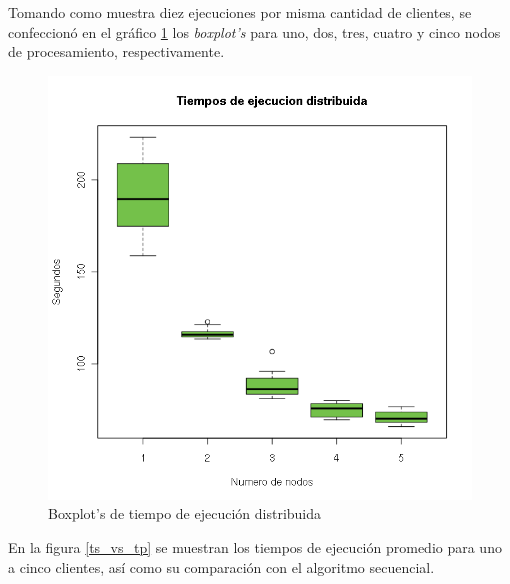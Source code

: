 Tomando como muestra diez ejecuciones por misma cantidad de clientes, se confeccionó en el gráfico \ref{execution_boxplot} los
\textit{boxplot's} para uno, dos, tres, cuatro y cinco nodos de procesamiento, respectivamente.
\begin{figure}[!ht]
    \begin{center}
        \includegraphics[scale=0.44]{images/execution_boxplot.png}
        \caption{Boxplot's de tiempo de ejecución distribuida}
        \label{execution_boxplot}
    \end{center}
\end{figure}

En la figura \ref{ts_vs_tp} se muestran los tiempos de ejecución promedio para uno a cinco clientes, así como su comparación con el
algoritmo secuencial.
 
